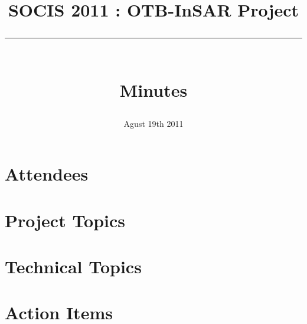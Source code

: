 \documentclass[a4paper,10pt,twoside]{article}
\title{SOCIS 2011 : OTB-InSAR Project \\ 
        {\rule{15cm}{0.5mm}}\\ 
	Minutes }
\date{Agust 19th 2011}
\begin{document}
\maketitle
\tableofcontents 

\section{Attendees}

\section{Project Topics}

\section{Technical Topics}

\section{Action Items}
\end{document}
